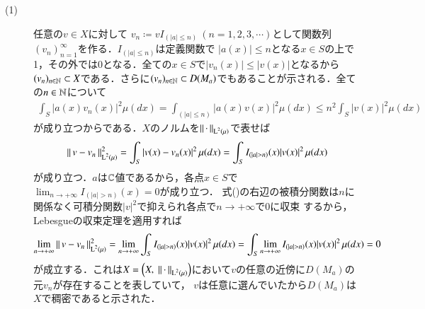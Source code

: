\begin{prf}
\begin{description}\mbox{}
	\item[(1)] 任意の$v \in X$に対して
		$v_n \coloneqq vI_{(|a| \leq n)}\ (n=1,2,3,\cdots)$として関数列$(v_n)_{n=1}^{\infty}$を作る．$I_{(|a| \leq n)}$は定義関数で
		$|a(x)| \leq n$となる$x \in S$の上で1，その外では0となる．全ての$x \in S$で$|v_n(x)| \leq |v(x)|$となるから
		$(v_n)_{n \in \mathbb{N}} \subset X$である．さらに$(v_n)_{n \in \mathbb{N}} \subset D(M_a)$でもあることが示される．全ての$n \in \mathbb{N}$について
		\begin{align}
			\int_{S} |a(x)v_n(x)|^2 \mu(dx) = \int_{(|a| \leq n)} |a(x)v(x)|^2 \mu(dx) \leq n^2  \int_{S} |v(x)|^2 \mu(dx)
		\end{align}
		が成り立つからである．$X$のノルムを$\left\|\, \cdot\, \right\|_{\operatorname{L}^{2} \left(\mu\right)}$で表せば
		\begin{align}
			\left\|\, v - v_n\, \right\|_{\operatorname{L}^{2} \left(\mu\right)}^2 = \int_{S} |v(x) - v_n(x)|^2\, \mu(dx) = \int_{S} I_{(|a| > n)}(x)|v(x)|^2\, \mu(dx)
			\label{eq:func_report_Q9_1}
		\end{align}
		が成り立つ．$a$は$\mathbb{C}$値であるから，各点$x \in S$で$\lim_{n \to +\infty} I_{(|a| > n)}(x) = 0$が成り立つ．
		式()の右辺の被積分関数は$n$に関係なく可積分関数$|v|^2$で抑えられ各点で$n \to +\infty$で$0$に収束
		するから，Lebesgueの収束定理を適用すれば
		\begin{align}
			\lim_{n \to +\infty} \left\|\, v - v_n\, \right\|_{\operatorname{L}^{2} \left(\mu\right)}^2 
			= \lim_{n \to +\infty} \int_{S} I_{(|a| > n)}(x)|v(x)|^2\, \mu(dx)
			= \int_{S} \lim_{n \to +\infty} I_{(|a| > n)}(x)|v(x)|^2\, \mu(dx)
			= 0
		\end{align}
		が成立する．これは$X = \left(X,\ \Norm{\cdot}{\Lp{2}{\mu}}\right)$において$v$の任意の近傍に$D(M_a)$の元$v_n$が存在することを表していて，
		$v$は任意に選んでいたから$D(M_a)$は$X$で稠密であると示された．
		

\end{description}
\end{prf}
